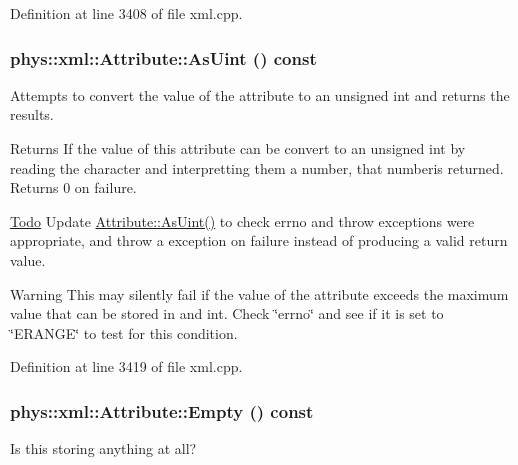 Definition at line 3408 of file xml.cpp.

\hypertarget{classphys_1_1xml_1_1Attribute_ad00ec5857fc4afcda892a0057419a9a0}{
\subsubsection[{AsUint}]{\setlength{\rightskip}{0pt plus 5cm}phys::xml::Attribute::AsUint () const}}
\label{da/ddf/classphys_1_1xml_1_1Attribute_ad00ec5857fc4afcda892a0057419a9a0}


Attempts to convert the value of the attribute to an unsigned int and returns the results. 

\begin{DoxyReturn}{Returns}
If the value of this attribute can be convert to an unsigned int by reading the character and interpretting them a number, that numberis returned. Returns 0 on failure. 
\end{DoxyReturn}
\begin{Desc}
\item[\hyperlink{todo__todo000044}{Todo}]Update \hyperlink{classphys_1_1xml_1_1Attribute_ad00ec5857fc4afcda892a0057419a9a0}{Attribute::AsUint()} to check errno and throw exceptions were appropriate, and throw a exception on failure instead of producing a valid return value. \end{Desc}
\begin{DoxyWarning}{Warning}
This may silently fail if the value of the attribute exceeds the maximum value that can be stored in and int. Check \char`\"{}errno\char`\"{} and see if it is set to \char`\"{}ERANGE\char`\"{} to test for this condition. 
\end{DoxyWarning}


Definition at line 3419 of file xml.cpp.

\hypertarget{classphys_1_1xml_1_1Attribute_a6d0157a562f283e9c87d1cc46b3405cc}{
\subsubsection[{Empty}]{\setlength{\rightskip}{0pt plus 5cm}phys::xml::Attribute::Empty () const}}
\label{da/ddf/classphys_1_1xml_1_1Attribute_a6d0157a562f283e9c87d1cc46b3405cc}


Is this storing anything at all? 

